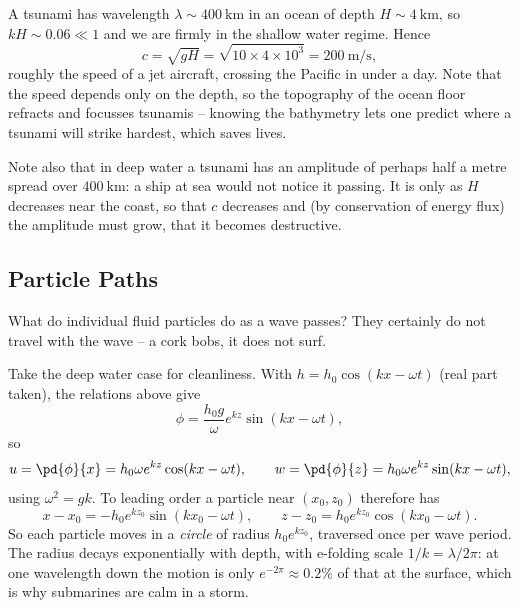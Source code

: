 \begin{example}[Tsunami]
	A tsunami has wavelength $\lambda \sim \SI{400}{\kilo\meter}$ in an ocean of depth $H \sim \SI{4}{\kilo\meter}$, so $kH \sim 0.06 \ll 1$ and we are firmly in the shallow water regime. Hence
	$$
	c = \sqrt{gH} = \sqrt{10\times 4\times 10^3} = \SI{200}{\meter\per\second},
	$$
	roughly the speed of a jet aircraft, crossing the Pacific in under a day. Note that the speed depends only on the depth, so the topography of the ocean floor refracts and focusses tsunamis -- knowing the bathymetry lets one predict where a tsunami will strike hardest, which saves lives.

	Note also that in deep water a tsunami has an amplitude of perhaps half a metre spread over $\SI{400}{\kilo\meter}$: a ship at sea would not notice it passing. It is only as $H$ decreases near the coast, so that $c$ decreases and (by conservation of energy flux) the amplitude must grow, that it becomes destructive.
\end{example}

\subsection{Particle Paths}

What do individual fluid particles do as a wave passes? They certainly do not travel with the wave -- a cork bobs, it does not surf.

Take the deep water case for cleanliness. With $h = h_0\cos(kx - \omega t)$ (real part taken), the relations above give
$$
\phi = \frac{h_0 g}{\omega}e^{kz}\sin(kx - \omega t),
$$
so
$$
u = \pd{\phi}{x} = h_0 \omega e^{kz}\cos(kx - \omega t), \qquad w = \pd{\phi}{z} = h_0\omega e^{kz}\sin(kx - \omega t),
$$
using $\omega^2 = gk$. To leading order a particle near $(x_0, z_0)$ therefore has
$$
x - x_0 = -h_0 e^{kz_0}\sin(kx_0 - \omega t), \qquad z - z_0 = h_0 e^{kz_0}\cos(kx_0 - \omega t).
$$
So each particle moves in a \emph{circle} of radius $h_0 e^{kz_0}$, traversed once per wave period. The radius decays exponentially with depth, with e-folding scale $1/k = \lambda/2\pi$: at one wavelength down the motion is only $e^{-2\pi} \approx 0.2\%$ of that at the surface, which is why submarines are calm in a storm.

